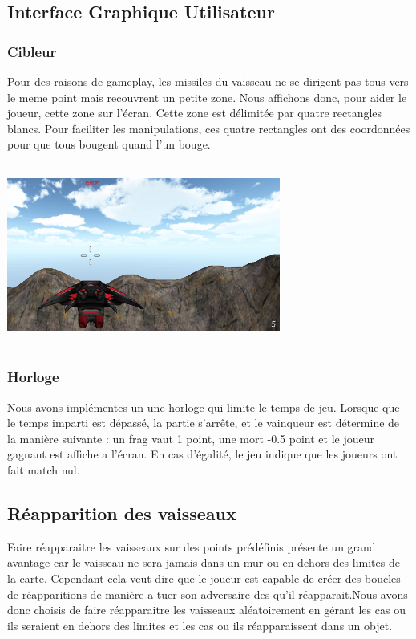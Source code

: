 \documentclass[10pt, titlepage]{report}
\begin{document}
\subsection{Interface Graphique  Utilisateur}

\subsubsection{Cibleur}
 Pour des raisons de gameplay, les missiles du vaisseau ne se dirigent pas tous vers le meme point mais recouvrent un petite zone. Nous affichons donc, pour aider le joueur, cette zone sur l'écran. Cette zone est délimitée par quatre rectangles blancs. Pour faciliter les manipulations, ces quatre rectangles ont des coordonnées pour que tous bougent quand l'un bouge. \\

\begin{center}
\includegraphics[height=6cm, width=9cm]{Capture_rebut.PNG}
\end{center}

\subsubsection{Horloge}
Nous avons implémentes un une horloge qui limite le temps de jeu. Lorsque que le temps imparti est dépassé, la partie s'arrête, et le vainqueur est détermine de la manière suivante : un frag vaut 1 point, une mort -0.5 point et le joueur gagnant est affiche a l'écran. En cas d'égalité, le jeu indique que les joueurs ont fait match nul.\\

\subsection{Réapparition des vaisseaux}  
Faire réapparaitre les vaisseaux sur des points prédéfinis présente un grand avantage car le vaisseau ne sera jamais dans un mur ou en dehors des limites de la carte. Cependant cela veut dire que le joueur est capable de créer des boucles de réapparitions de manière a tuer son adversaire des qu'il réapparait.Nous avons donc choisis de faire réapparaitre les vaisseaux aléatoirement en gérant les cas ou ils seraient en dehors des limites et les cas ou ils réapparaissent dans un objet.\\
\end{document}

